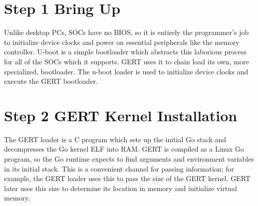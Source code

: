 

\section{Step 1 Bring Up}
Unlike desktop PCs, SOCs have no BIOS, so it is entirely the programmer's job to initialize device clocks
and power on essential peripherals like the memory controller. U-boot is a simple bootloader which abstracts
this laborious process for all of the SOCs which it supports. GERT uses it to chain load its own, more specialized,
bootloader. The u-boot loader is used to initialize device clocks and execute the GERT bootloader.



\section{Step 2 GERT Kernel Installation}
The GERT loader is a C program which sets up the initial Go stack and decompresses the Go kernel
ELF into RAM. GERT is compiled as a Linux Go program, so the Go runtime expects to find arguments
and environment variables in its initial stack. This is a convenient channel for passing
information; for example, the GERT loader uses this to pass the size of the GERT kernel.
GERT later uses this size to determine its location in memory and initialize virtual memory.

